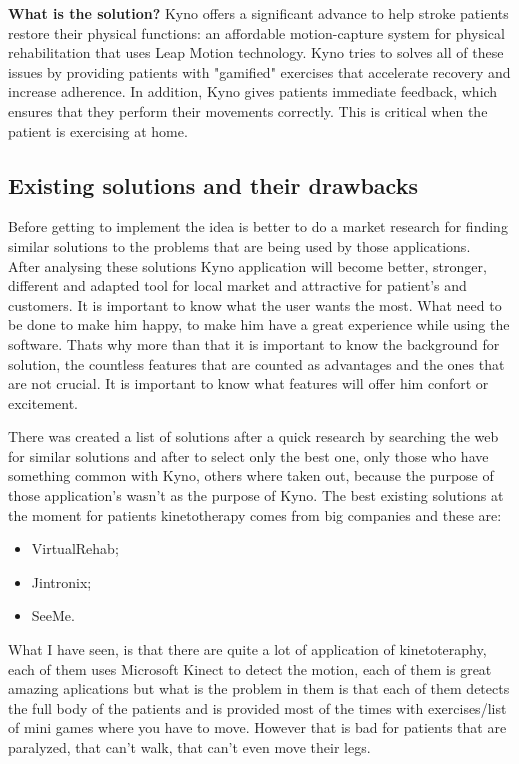 \textbf{What is the solution?}
Kyno offers a significant advance to help stroke patients restore their physical functions: an affordable motion-capture system for physical rehabilitation that uses Leap Motion technology.
Kyno tries to solves all of these issues by providing patients with "gamified" exercises that accelerate recovery and increase adherence. In addition, Kyno gives patients immediate feedback, which ensures that they perform their movements correctly. This is critical when the patient is exercising at home.



\subsection{Existing solutions and their drawbacks}
Before getting to implement the idea is better to do a market research for finding similar solutions to the problems that are being used by those applications.
\\
After analysing these solutions Kyno application will become better, stronger, different and adapted tool for local market and attractive for patient's and customers.
It is important to know what the user wants the most. What need to be done to make him happy, to make him have a great experience while using the software. Thats why more than that it is important to know the background for solution, the countless features that are counted as advantages and the ones that are not crucial. It is important to know what features will offer him confort or excitement. 

There was created a list of solutions after a quick research by searching the web for similar solutions and after to select only the best one, only those who have something common with Kyno, others where taken out, because the purpose of those application's wasn't as the purpose  of Kyno. The best existing solutions at the moment for patients kinetotherapy comes from big companies and these are: 

\begin{itemize}
\item VirtualRehab;
\item Jintronix;
\item SeeMe.
\end{itemize}

What I have seen, is that there are quite a lot of application of kinetoteraphy, each of them uses Microsoft Kinect to detect the motion, each of them is great amazing aplications but what is the problem in them is that each of them detects the full body of the patients and is provided most of the times with exercises/list of mini games where you have to move. However that is bad for patients that are paralyzed, that can't walk, that can't even move their legs.


